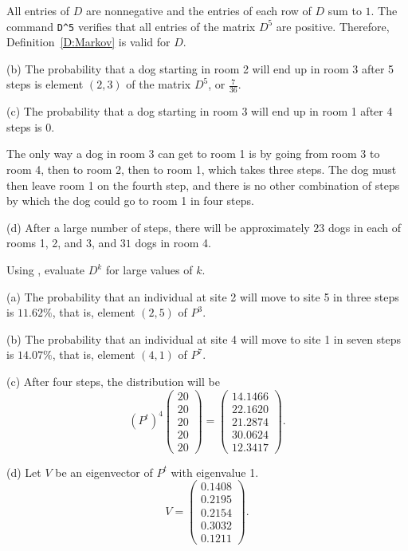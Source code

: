 \documentclass{ximera}
\begin{document}
\soln All entries of $D$ are nonnegative and the entries of each row of
$D$ sum to $1$.  The \Matlab command {\tt D\^{}5} verifies that all
entries of the matrix $D^5$ are positive.  Therefore,
Definition~\ref{D:Markov} is valid for $D$.

(b) The probability that a dog starting in room 2 will end up in room
3 after 5 steps is element $(2,3)$ of the matrix $D^5$, or
$\frac{7}{36}$.

(c) \ans The probability that a dog starting in room 3 will end up in room
1 after 4 steps is 0.

\soln The only way a dog in room 3 can get to room 1
is by going from room 3 to room 4, then to room 2, then to room 1, which
takes three steps.  The dog must then leave room 1 on the fourth step,
and there is no other combination of steps by which the dog could go to
room 1 in four steps.

(d) \ans After a large number of steps, there will be approximately $23$
dogs in each of rooms 1, 2, and 3, and $31$ dogs in room 4.

\soln Using \Matlab, evaluate $D^k$ for large values of $k$.

\newpage
{}
(a) The probability that an individual at site 2 will move to site 5 in
three steps is $11.62\%$, that is, element $(2,5)$ of $P^3$.

(b) The probability that an individual at site 4 will move to site 1 in
seven steps is $14.07\%$, that is, element $(4,1)$ of $P^7$.

(c) After four steps, the distribution will be
\[ (P^t)^4\left(\begin{array}{r} 20 \\ 20 \\ 20 \\ 20 \\ 20
\end{array}\right) = \left(\begin{array}{r} 14.1466 \\ 22.1620 \\
21.2874 \\ 30.0624 \\ 12.3417 \end{array}\right). \]

(d) \ans Let $V$ be an eigenvector of $P^t$ with eigenvalue 1.
\[
V = \left(\begin{array}{r} 0.1408 \\ 0.2195 \\ 0.2154 \\ 0.3032
\\ 0.1211 \end{array}\right).
\]
\end{document}
